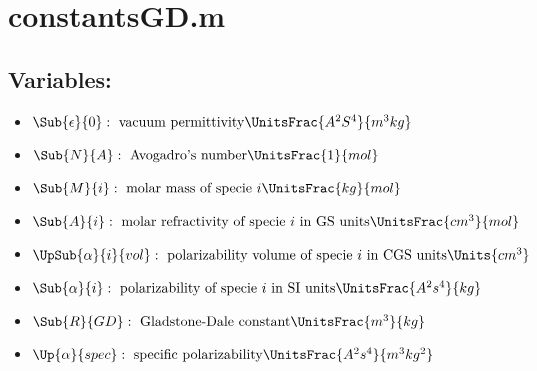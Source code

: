





    \section{\bf{\Large{constantsGD.m}}}
        \subsection*{Variables:}
            \begin{itemize}
                \item $ \Sub{\epsilon}{0}:\text{ vacuum permittivity}\UnitsFrac{A^2S^4}{m^3kg} $ 
                \item $ \Sub{N}{A}:\text{ Avogadro's number}\UnitsFrac{1}{mol} $
                \item $ \Sub{M}{i}:\text{ molar mass of specie }i\UnitsFrac{kg}{mol} $
                \item $ \Sub{A}{i}: \text{ molar refractivity of specie }i\text{ in GS units}\UnitsFrac{cm^3}{mol} $ 
                \item $ \UpSub{\alpha}{i}{vol}:\text{ polarizability volume of specie }i\text{ in CGS units}\Units{cm^3} $
                \item $ \Sub{\alpha}{i}:\text{ polarizability of specie }i\text{ in SI units}\UnitsFrac{A^2s^4}{kg} $
                \item $ \Sub{R}{GD}:\text{ Gladstone-Dale constant}\UnitsFrac{m^3}{kg} $
                \item $ \Up{\alpha}{spec}:\text{ specific polarizability}\UnitsFrac{A^2s^4}{m^3kg^2} $
            \end{itemize}
        
